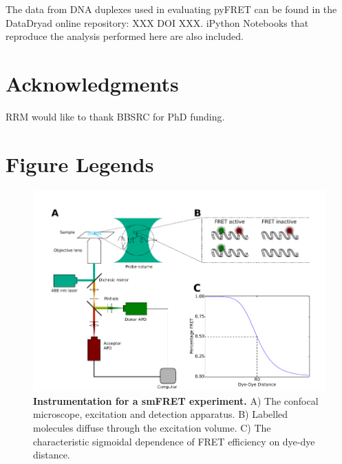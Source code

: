 \documentclass[10pt]{article}
\begin{document}
The data from DNA duplexes used in evaluating pyFRET can be found in the DataDryad online repository: XXX DOI XXX. iPython Notebooks that reproduce the analysis performed here are also included.

\section*{Acknowledgments}
RRM would like to thank BBSRC for PhD funding.




\section*{Figure Legends}

\begin{figure}[!ht]
   \begin{center}
      \includegraphics*[clip=true, width=5in]{Fig1_schematic.pdf}
      \caption{{\bf Instrumentation for a smFRET experiment.} A) The confocal microscope, excitation and detection apparatus. B) Labelled molecules diffuse through the excitation volume. C) The characteristic sigmoidal dependence of FRET efficiency on dye-dye distance.}
      \label{fig:fig1_instrumentation}
   \end{center}
\end{figure}
\end{document}
